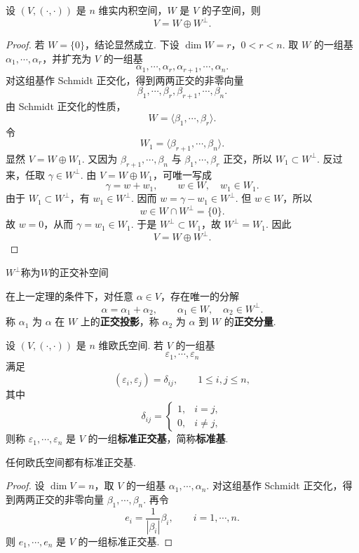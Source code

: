 \begin{theorem}
	设 $(V,(\cdot,\cdot))$ 是 $n$ 维实内积空间，$W$ 是 $V$ 的子空间，则
	\[
	V=W\oplus W^{\perp}.
	\]
\end{theorem}
\begin{proof}
	若 $W=\{0\}$，结论显然成立. 下设 $\dim W=r$，$0<r<n$. 取 $W$ 的一组基 $\alpha_1,\cdots,\alpha_r$，并扩充为 $V$ 的一组基
	\[
	\alpha_1,\cdots,\alpha_r,\alpha_{r+1},\cdots,\alpha_n.
	\]
	对这组基作 Schmidt 正交化，得到两两正交的非零向量
	\[
	\beta_1,\cdots,\beta_r,\beta_{r+1},\cdots,\beta_n.
	\]
	由 Schmidt 正交化的性质，
	\[
	W=\langle\beta_1,\cdots,\beta_r\rangle.
	\]
	令
	\[
	W_1=\langle\beta_{r+1},\cdots,\beta_n\rangle.
	\]
	显然 $V=W\oplus W_1$. 又因为 $\beta_{r+1},\cdots,\beta_n$ 与 $\beta_1,\cdots,\beta_r$ 正交，所以 $W_1\subset W^{\perp}$.
	反过来，任取 $\gamma\in W^{\perp}$. 由 $V=W\oplus W_1$，可唯一写成
	\[
	\gamma=w+w_1,
	\qquad w\in W,
	\quad w_1\in W_1.
	\]
	由于 $W_1\subset W^{\perp}$，有 $w_1\in W^{\perp}$. 因而 $w=\gamma-w_1\in W^{\perp}$. 但 $w\in W$，所以
	\[
	w\in W\cap W^{\perp}=\{0\}.
	\]
	故 $w=0$，从而 $\gamma=w_1\in W_1$. 于是 $W^{\perp}\subset W_1$，故 $W^{\perp}=W_1$. 因此
	\[
	V=W\oplus W^{\perp}.
	\]
\end{proof}
$ W^{\perp}$称为$W$的正交补空间
\begin{definition}\label{p1:concept:c6-l386}
	在上一定理的条件下，对任意 $\alpha\in V$，存在唯一的分解
	\[
	\alpha=\alpha_1+\alpha_2,
	\qquad
	\alpha_1\in W,
	\quad
	\alpha_2\in W^{\perp}.
	\]
	称 $\alpha_1$ 为 $\alpha$ 在 $W$ 上的\textbf{正交投影}，称 $\alpha_2$ 为 $\alpha$ 到 $W$ 的\textbf{正交分量}.
\end{definition}


\begin{definition}\label{p1:concept:c6-l399}
	设 $(V,(\cdot,\cdot))$ 是 $n$ 维欧氏空间. 若 $V$ 的一组基
	\[
	\varepsilon_1,\cdots,\varepsilon_n
	\]
	满足
	\[
	(\varepsilon_i,\varepsilon_j)=\delta_{ij},
	\qquad 1\leqslant i,j\leqslant n,
	\]
	其中
	\[
	\delta_{ij}=\begin{cases}
		1, & i=j,\\
		0, & i\ne j,
	\end{cases}
	\]
	则称 $\varepsilon_1,\cdots,\varepsilon_n$ 是 $V$ 的一组\textbf{标准正交基}，简称\textbf{标准基}.
\end{definition}

\begin{corollary}
	任何欧氏空间都有标准正交基.
\end{corollary}
\begin{proof}
	设 $\dim V=n$，取 $V$ 的一组基 $\alpha_1,\cdots,\alpha_n$. 对这组基作 Schmidt 正交化，得到两两正交的非零向量 $\beta_1,\cdots,\beta_n$. 再令
	\[
	e_i=\frac{1}{|\beta_i|}\beta_i,
	\qquad i=1,\cdots,n.
	\]
	则 $e_1,\cdots,e_n$ 是 $V$ 的一组标准正交基.
\end{proof}

